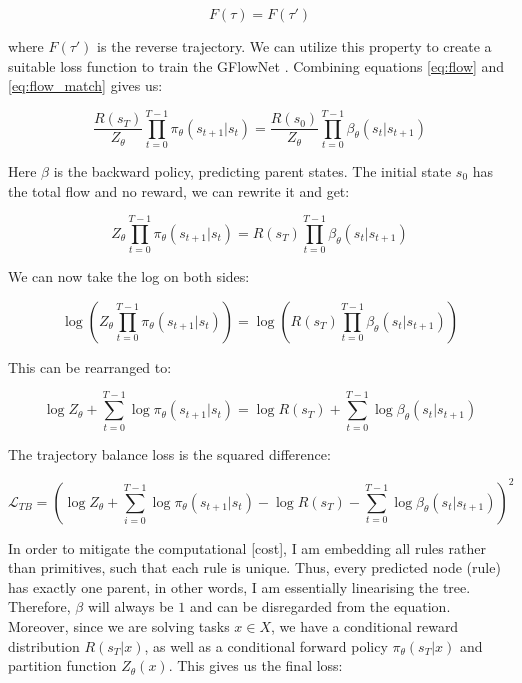 \begin{equation} \label{eq:flow_match}
    F(\tau) = F(\tau')
\end{equation}

where \( F(\tau') \) is the reverse trajectory.
We can utilize this property to create a suitable loss function to train the GFlowNet \cite{malkin_trajectory_2022}. Combining equations \ref{eq:flow} and \ref{eq:flow_match} gives us:

\begin{equation}
    \frac{R(s_T)}{Z_\theta} \prod_{t=0}^{T-1} \pi_\theta(s_{t+1} | s_{t}) = \frac{R(s_0)}{Z_\theta} \prod_{t=0}^{T-1} \beta_\theta(s_{t} | s_{t+1})
\end{equation}

Here \( \beta \) is the backward policy, predicting parent states. 
The initial state \(s_0\) has the total flow and no reward, we can rewrite it and get:

\begin{equation}
    Z_{\theta} \prod_{t=0}^{T-1} \pi_\theta(s_{t+1} | s_{t}) = R(s_T) \prod_{t=0}^{T-1} \beta_\theta(s_{t} | s_{t+1})
\end{equation}

We can now take the log on both sides:

\begin{equation}
    \log \left(Z_{\theta} \prod_{t=0}^{T-1} \pi_\theta(s_{t+1} | s_{t})\right) = \log \left(R(s_T) \prod_{t=0}^{T-1} \beta_\theta(s_{t} | s_{t+1})\right)
\end{equation}

This can be rearranged to:

\begin{equation}
    \log Z_\theta + \sum_{t=0}^{T-1} \log \pi_\theta(s_{t+1}|s_{t}) = \log R(s_T) + \sum_{t=0}^{T-1} \log \beta_\theta(s_{t}|s_{t+1})
\end{equation}

The trajectory balance loss is the squared difference:

\begin{equation}
    \mathcal{L}_{TB} = \left(\log Z_\theta + \sum_{i=0}^{T-1} \log \pi_\theta(s_{t+1}|s_{t}) - \log R(s_T) - \sum_{t=0}^{T-1} \log \beta_\theta(s_{t}|s_{t+1})\right)^2
\end{equation}

In order to mitigate the computational [cost], I am embedding all rules rather than primitives, such that each rule is unique. Thus, every predicted node (rule) has exactly one parent, in other words, I am essentially linearising the tree. Therefore, $\beta$ will always be $1$ and can be disregarded from the equation.
Moreover, since we are solving tasks \( x \in X \), we have a conditional reward distribution $R(s_T|x)$, as well as a conditional forward policy $\pi_\theta(s_T|x)$ and partition function $Z_\theta(x)$.
This gives us the final loss:

